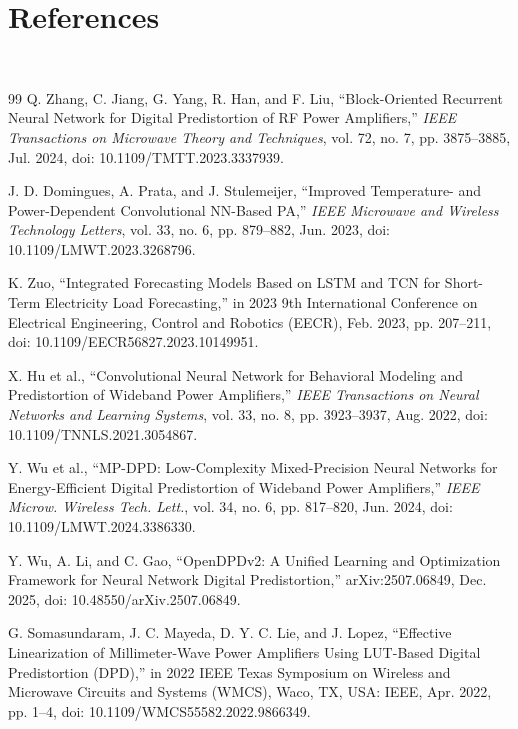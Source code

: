 \documentclass[20pt, cjk, slidetop, table]{beamer}
\begin{document}
\section{References}
\begin{frame}[allowframebreaks]
    
    
   \\%
\begin{thebibliography}{99}
 Q. Zhang, C. Jiang, G. Yang, R. Han, and F. Liu, ``Block-Oriented Recurrent Neural Network for Digital Predistortion of RF Power Amplifiers,'' \emph{IEEE Transactions on Microwave Theory and Techniques}, vol. 72, no. 7, pp. 3875--3885, Jul. 2024, doi: 10.1109/TMTT.2023.3337939.

 J. D. Domingues, A. Prata, and J. Stulemeijer, ``Improved Temperature- and Power-Dependent Convolutional NN-Based PA,'' \emph{IEEE Microwave and Wireless Technology Letters}, vol. 33, no. 6, pp. 879--882, Jun. 2023, doi: 10.1109/LMWT.2023.3268796.

 K. Zuo, ``Integrated Forecasting Models Based on LSTM and TCN for Short-Term Electricity Load Forecasting,'' in 2023 9th International Conference on Electrical Engineering, Control and Robotics (EECR), Feb. 2023, pp. 207--211, doi: 10.1109/EECR56827.2023.10149951.

 X. Hu et al., ``Convolutional Neural Network for Behavioral Modeling and Predistortion of Wideband Power Amplifiers,'' \emph{IEEE Transactions on Neural Networks and Learning Systems}, vol. 33, no. 8, pp. 3923--3937, Aug. 2022, doi: 10.1109/TNNLS.2021.3054867.

 Y. Wu et al., ``MP-DPD: Low-Complexity Mixed-Precision Neural Networks for Energy-Efficient Digital Predistortion of Wideband Power Amplifiers,'' \emph{IEEE Microw. Wireless Tech. Lett.}, vol. 34, no. 6, pp. 817--820, Jun. 2024, doi: 10.1109/LMWT.2024.3386330.

 Y. Wu, A. Li, and C. Gao, ``OpenDPDv2: A Unified Learning and Optimization Framework for Neural Network Digital Predistortion,'' arXiv:2507.06849, Dec. 2025, doi: 10.48550/arXiv.2507.06849.

 G. Somasundaram, J. C. Mayeda, D. Y. C. Lie, and J. Lopez, ``Effective Linearization of Millimeter-Wave Power Amplifiers Using LUT-Based Digital Predistortion (DPD),'' in 2022 IEEE Texas Symposium on Wireless and Microwave Circuits and Systems (WMCS), Waco, TX, USA: IEEE, Apr. 2022, pp. 1--4, doi: 10.1109/WMCS55582.2022.9866349.


\end{thebibliography}
\end{frame}
\end{document}
